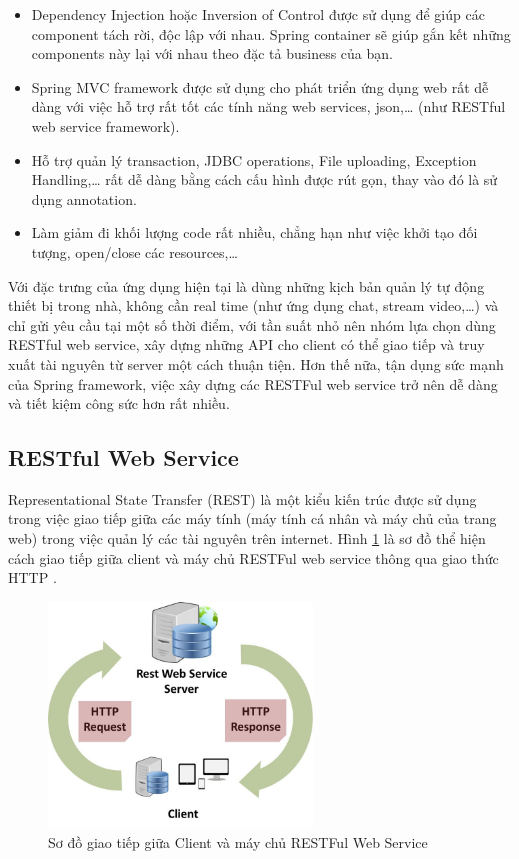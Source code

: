 \documentclass[12pt,a4paper,oneside]{extbook}
\begin{document}
\begin{itemize}[topsep=1mm,itemsep=-0.5mm]
\item Dependency Injection hoặc Inversion of Control được sử dụng để giúp các component tách rời, độc lập với nhau. Spring container sẽ giúp gắn kết những components này lại với nhau theo đặc tả business của bạn.
\item Spring MVC framework được sử dụng cho phát triển ứng dụng web rất dễ dàng với việc hỗ trợ rất tốt các tính năng web services, json,\dots\hspace{0mm}  (như RESTful web service framework).
\item Hỗ trợ quản lý transaction, JDBC operations, File uploading, Exception Handling,\dots\hspace{0mm} rất dễ dàng bằng cách cấu hình được rút gọn, thay vào đó là sử dụng annotation.
\item Làm giảm đi khối lượng code rất nhiều, chẳng hạn như việc khởi tạo đối tượng, open/close các resources,\dots
\vspace{1mm}
\end{itemize}

Với đặc trưng của ứng dụng hiện tại là dùng những kịch bản quản lý tự động thiết bị trong nhà, không cần real time (như ứng dụng chat, stream video,\dots) và chỉ gửi yêu cầu tại một số thời điểm, với tần suất nhỏ nên nhóm lựa chọn dùng RESTful web service, xây dựng những API cho client có thể giao tiếp và truy xuất tài nguyên từ server một cách thuận tiện. Hơn thế nữa, tận dụng sức mạnh của Spring framework, việc xây dựng các RESTFul web service trở nên dễ dàng và tiết kiệm công sức hơn rất nhiều.

\subsection{RESTful Web Service}

Representational State Transfer (REST) là một kiểu kiến trúc được sử dụng trong việc giao tiếp giữa các máy tính (máy tính cá nhân và máy chủ của trang web) trong việc quản lý các tài nguyên trên internet. Hình \ref{fig:3-client-communicate-RESTfulWS} là sơ đồ thể hiện cách giao tiếp giữa client và máy chủ RESTFul web service thông qua giao thức HTTP \cite{restful-basic}.

\begin{figure}[h]
  \centering
     \includegraphics[width=7cm]{3-client-communicate-RESTfulWS}
  \caption{Sơ đồ giao tiếp giữa Client và máy chủ RESTFul Web Service}\label{fig:3-client-communicate-RESTfulWS}
\end{figure}
\end{document}

